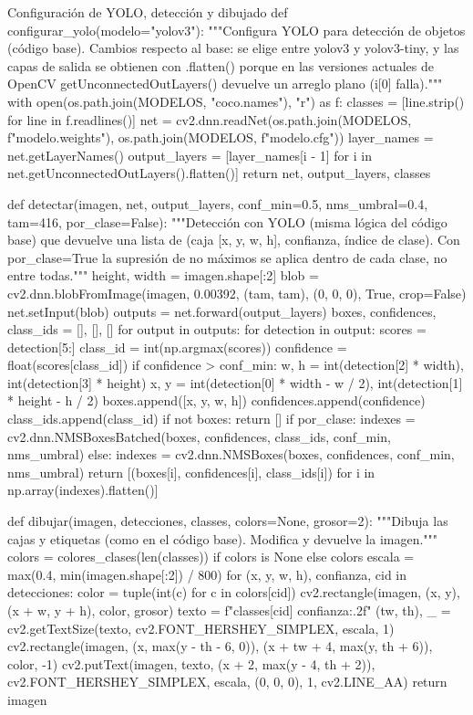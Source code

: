 \documentclass[11pt,letterpaper]{article}
\begin{document}
\begin{codigo}[label=cod:yolo]{Configuración de YOLO, detección y dibujado}
def configurar_yolo(modelo="yolov3"):
    """Configura YOLO para detección de objetos (código base). Cambios respecto al base: se elige
    entre yolov3 y yolov3-tiny, y las capas de salida se obtienen con .flatten() porque en las
    versiones actuales de OpenCV getUnconnectedOutLayers() devuelve un arreglo plano (i[0] falla)."""
    with open(os.path.join(MODELOS, "coco.names"), "r") as f:
        classes = [line.strip() for line in f.readlines()]
    net = cv2.dnn.readNet(os.path.join(MODELOS, f"{modelo}.weights"), os.path.join(MODELOS, f"{modelo}.cfg"))
    layer_names = net.getLayerNames()
    output_layers = [layer_names[i - 1] for i in net.getUnconnectedOutLayers().flatten()]
    return net, output_layers, classes


def detectar(imagen, net, output_layers, conf_min=0.5, nms_umbral=0.4, tam=416, por_clase=False):
    """Detección con YOLO (misma lógica del código base) que devuelve una lista de
    (caja [x, y, w, h], confianza, índice de clase). Con por_clase=True la supresión de no
    máximos se aplica dentro de cada clase, no entre todas."""
    height, width = imagen.shape[:2]
    blob = cv2.dnn.blobFromImage(imagen, 0.00392, (tam, tam), (0, 0, 0), True, crop=False)
    net.setInput(blob)
    outputs = net.forward(output_layers)
    boxes, confidences, class_ids = [], [], []
    for output in outputs:
        for detection in output:
            scores = detection[5:]
            class_id = int(np.argmax(scores))
            confidence = float(scores[class_id])
            if confidence > conf_min:
                w, h = int(detection[2] * width), int(detection[3] * height)
                x, y = int(detection[0] * width - w / 2), int(detection[1] * height - h / 2)
                boxes.append([x, y, w, h])
                confidences.append(confidence)
                class_ids.append(class_id)
    if not boxes:
        return []
    if por_clase:
        indexes = cv2.dnn.NMSBoxesBatched(boxes, confidences, class_ids, conf_min, nms_umbral)
    else:
        indexes = cv2.dnn.NMSBoxes(boxes, confidences, conf_min, nms_umbral)
    return [(boxes[i], confidences[i], class_ids[i]) for i in np.array(indexes).flatten()]

def dibujar(imagen, detecciones, classes, colors=None, grosor=2):
    """Dibuja las cajas y etiquetas (como en el código base). Modifica y devuelve la imagen."""
    colors = colores_clases(len(classes)) if colors is None else colors
    escala = max(0.4, min(imagen.shape[:2]) / 800)
    for (x, y, w, h), confianza, cid in detecciones:
        color = tuple(int(c) for c in colors[cid])
        cv2.rectangle(imagen, (x, y), (x + w, y + h), color, grosor)
        texto = f"{classes[cid]} {confianza:.2f}"
        (tw, th), _ = cv2.getTextSize(texto, cv2.FONT_HERSHEY_SIMPLEX, escala, 1)
        cv2.rectangle(imagen, (x, max(y - th - 6, 0)), (x + tw + 4, max(y, th + 6)), color, -1)
        cv2.putText(imagen, texto, (x + 2, max(y - 4, th + 2)), cv2.FONT_HERSHEY_SIMPLEX, escala, (0, 0, 0), 1, cv2.LINE_AA)
    return imagen
\end{codigo}
\end{document}
